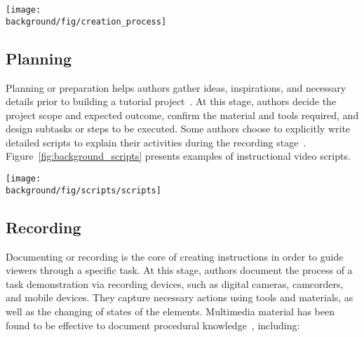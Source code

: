 \begin{figure*}[!t]
  \centering
  \texttt{[image: \\background/fig/creation\_process]}
  \caption{A common workflow of tutorial creation, which includes planning the task in detail, recording the process, editing the captured content into a readable form, and sharing with the communities.}
  \label{fig:background_creation}
\end{figure*}


\subsection{Planning}
Planning or preparation helps authors gather ideas, inspirations, and necessary details prior to building a tutorial project~\cite{Torrey:2007he}. At this stage, authors decide the project scope and expected outcome, confirm the material and tools required, and design subtasks or steps to be executed. Some authors choose to explicitly write detailed scripts to explain their activities during the recording stage~\cite{Chi:2013:DGC:2501988.2502052}. Figure~\ref{fig:background_scripts} presents examples of instructional video scripts.

\begin{figure*}[th!]
  \centering
  \texttt{[image: \\background/fig/scripts/scripts]}
  \caption{Example scripts for instructional videos about a) food safety~\protect\cite{WisconsinFoodSafetyScript} and b) cooking ~\protect\cite{SouthernIllinoisScript}. Each includes video shot(s) and narration, some with additional notes on the actions. High-level structure can also be specified, such as ``introduction'' and ``conclusion.''}
  \label{fig:background_scripts}
\end{figure*}

\subsection{Recording}
Documenting or recording is the core of creating instructions in order to guide viewers through a specific task. At this stage, authors document the process of a task demonstration via recording devices, such as digital cameras, camcorders, and mobile devices. They capture necessary actions using tools and materials, as well as the changing of states of the elements.
%
Multimedia material has been found to be effective to document procedural knowledge~\cite{Kuznetsov:2010:REA:1868914.1868950,Wakkary:2015:TAH:2702123.2702550,Moreno2007}, including:

